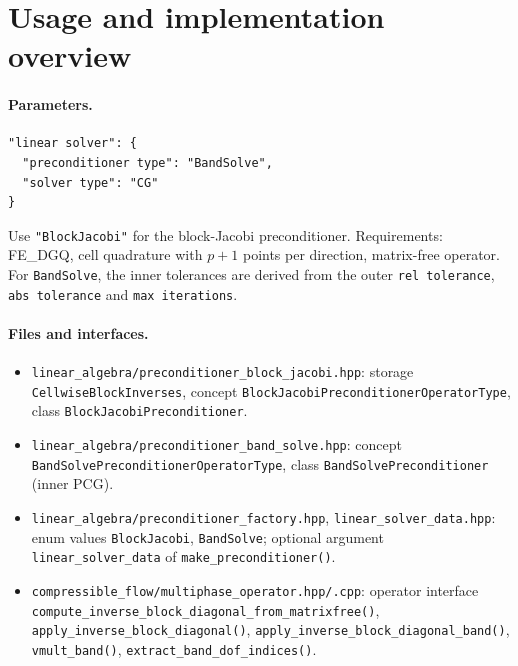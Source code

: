 \documentclass[11pt,a4paper]{article}
\newcommand{\code}[1]{\nolinkurl{#1}}
\newcommand{\param}[1]{\texttt{#1}}
\begin{document}
\section{Usage and implementation overview}
\label{sec:usage}

\paragraph{Parameters.}
\begin{verbatim}
"linear solver": {
  "preconditioner type": "BandSolve",
  "solver type": "CG"
}
\end{verbatim}
Use \param{"BlockJacobi"} for the block-Jacobi preconditioner.
Requirements: FE\_DGQ, cell quadrature with $p+1$ points per direction, matrix-free operator.
For \param{BandSolve}, the inner tolerances are derived from the outer \param{rel tolerance},
\param{abs tolerance} and \param{max iterations}.

\paragraph{Files and interfaces.}
{\sloppy
\begin{itemize}[leftmargin=*]
  \item \code{linear_algebra/preconditioner_block_jacobi.hpp}: storage
        \code{CellwiseBlockInverses}, concept \code{BlockJacobiPreconditionerOperatorType}, class
        \code{BlockJacobiPreconditioner}.
  \item \code{linear_algebra/preconditioner_band_solve.hpp}: concept
        \code{BandSolvePreconditionerOperatorType}, class \code{BandSolvePreconditioner} (inner PCG).
  \item \code{linear_algebra/preconditioner_factory.hpp}, \code{linear_solver_data.hpp}: enum values
        \param{BlockJacobi}, \param{BandSolve}; optional argument \code{linear_solver_data} of
        \code{make_preconditioner()}.
  \item \code{compressible_flow/multiphase_operator.hpp/.cpp}: operator interface
        \code{compute_inverse_block_diagonal_from_matrixfree()},
        \code{apply_inverse_block_diagonal()}, \code{apply_inverse_block_diagonal_band()},
        \code{vmult_band()}, \code{extract_band_dof_indices()}.
\end{itemize}
\par}
\end{document}
